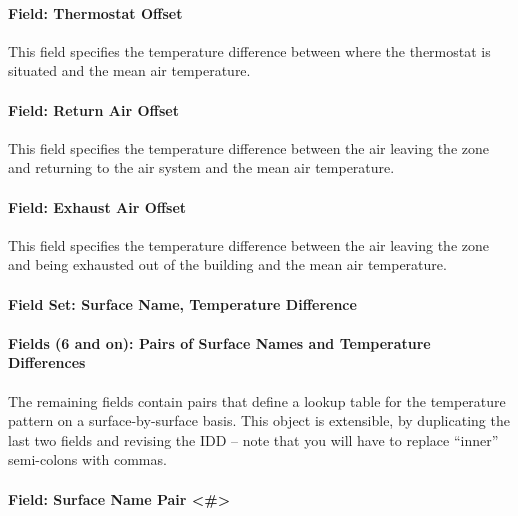 \paragraph{Field: Thermostat Offset}\label{field-thermostat-offset-2}

This field specifies the temperature difference between where the thermostat is situated and the mean air temperature.

\paragraph{Field: Return Air Offset}\label{field-return-air-offset-2}

This field specifies the temperature difference between the air leaving the zone and returning to the air system and the mean air temperature.

\paragraph{Field: Exhaust Air Offset}\label{field-exhaust-air-offset-2}

This field specifies the temperature difference between the air leaving the zone and being exhausted out of the building and the mean air temperature.

\paragraph{Field Set: Surface Name, Temperature Difference}\label{field-set-surface-name-temperature-difference}

\paragraph{Fields (6 and on): Pairs of Surface Names and Temperature Differences}\label{fields-6-and-on-pairs-of-surface-names-and-temperature-differences}

The remaining fields contain pairs that define a lookup table for the temperature pattern on a surface-by-surface basis. This object is extensible, by duplicating the last two fields and revising the IDD -- note that you will have to replace ``inner'' semi-colons with commas.

\paragraph{Field: Surface Name Pair \textless{}\#\textgreater{}}\label{field-surface-name-pair}

